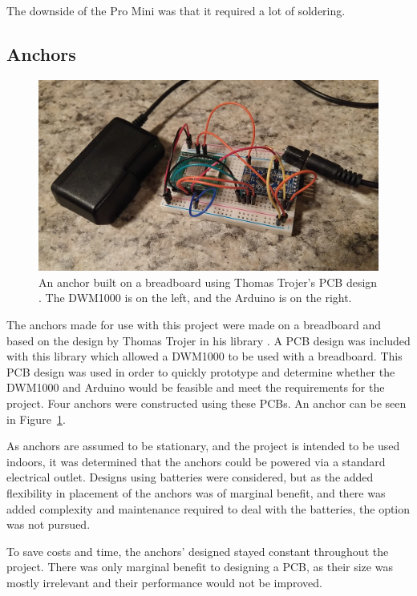 The downside of the Pro Mini was that it required a lot of soldering. 

\subsection{Anchors}
\begin{figure}
	\centering
	\includegraphics[width=\linewidth]{Figures/Anchor.jpg}
	\decoRule
	\caption{An anchor built on a breadboard using Thomas Trojer's PCB design \cite{ThotroGithub}. The DWM1000 is on the left, and the Arduino is on the right.}
	\label{fig:Anchor}
\end{figure}

The anchors made for use with this project were made on a breadboard and based on the design by Thomas Trojer in his  library \cite{ThotroGithub}. A PCB design was included with this library which allowed a DWM1000 to be used with a breadboard. This PCB design was used in order to quickly prototype and determine whether the DWM1000 and Arduino would be feasible and meet the requirements for the project. Four anchors were constructed using these PCBs. An anchor can be seen in Figure~\ref{fig:Anchor}.

As anchors are assumed to be stationary, and the project is intended to be used indoors, it was determined that the anchors could be powered via a standard electrical outlet. Designs using batteries were considered, but as the added flexibility in placement of the anchors was of marginal benefit, and there was added complexity and maintenance required to deal with the batteries, the option was not pursued.

To save costs and time, the anchors' designed stayed constant throughout the project. There was only marginal benefit to designing a PCB, as their size was mostly irrelevant and their performance would not be improved.

